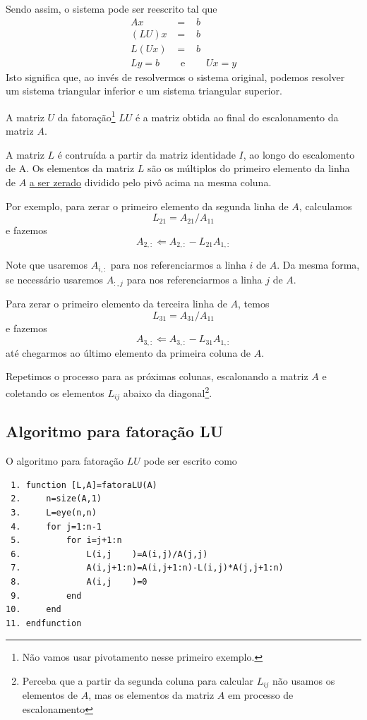 Sendo assim, o sistema pode ser reescrito tal que
\begin{eqnarray*}
  Ax &=&b \\
  (LU)x &=&b \\
  L(Ux) &=&b \\
  L y = b \quad & \text{ e }& \quad Ux=y
\end{eqnarray*}
Isto significa que, ao invés de resolvermos o sistema original, podemos resolver um sistema triangular inferior e um sistema triangular superior.

A matriz $U$ da fatoração\footnote{Não vamos usar pivotamento nesse primeiro exemplo.} $LU$ é a matriz obtida ao final do escalonamento da matriz $A$.

A matriz $L$ é contruída  a partir da matriz identidade $I$, ao longo do escalomento de A. Os elementos da matriz $L$ são os múltiplos do primeiro elemento da linha de $A$ \underline{a ser zerado} dividido pelo pivô acima na mesma coluna.

Por exemplo, para zerar o primeiro elemento da segunda linha de $A$, calculamos
$$L_{21}=A_{21}/A_{11}$$
e fazemos 
$$A_{2,:} \Leftarrow A_{2,:} - L_{21}A_{1,:}$$

Note que usaremos $A_{i,:}$ para nos referenciarmos a linha $i$ de $A$. Da mesma forma, se necessário usaremos $A_{:,j}$ para nos referenciarmos a linha $j$ de $A$.

Para zerar o primeiro elemento da terceira linha de $A$, temos
$$L_{31}=A_{31}/A_{11}$$
e fazemos 
$$A_{3,:} \Leftarrow A_{3,:} - L_{31}A_{1,:}$$
até chegarmos ao último elemento da primeira coluna de $A$.

Repetimos o processo para as próximas colunas, escalonando a matriz $A$ e coletando os elementos $L_{ij}$ abaixo da diagonal\footnote{Perceba que a partir da segunda coluna para calcular $L_{ij}$ não usamos os elementos de $A$, mas os elementos da matriz $A$ em processo de escalonamento}.





\subsection{Algoritmo para fatoração LU}
O algoritmo para fatoração $LU$ pode ser escrito como
\begin{verbatim}
 1. function [L,A]=fatoraLU(A)
 2.     n=size(A,1)
 3.     L=eye(n,n)
 4.     for j=1:n-1
 5.         for i=j+1:n
 6.             L(i,j    )=A(i,j)/A(j,j)
 7.             A(i,j+1:n)=A(i,j+1:n)-L(i,j)*A(j,j+1:n)
 8.             A(i,j    )=0
 9.         end
10.     end
11. endfunction
\end{verbatim}

